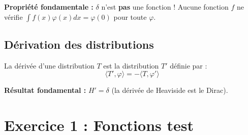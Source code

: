 \documentclass[11pt,a4paper]{report}
\begin{document}
\textbf{Propriété fondamentale :} $\delta$ n'est \textbf{pas} une fonction ! Aucune fonction $f$ ne vérifie $\int f(x)\varphi(x)dx = \varphi(0)$ pour toute $\varphi$.

\subsection*{Dérivation des distributions}

\begin{tcolorbox}[colback=ThemeLight, colframe=Theme, title=Définition : Dérivée d'une distribution]
La dérivée d'une distribution $T$ est la distribution $T'$ définie par :
\[
\langle T', \varphi \rangle = -\langle T, \varphi' \rangle
\]
\end{tcolorbox}

\textbf{Résultat fondamental :} $H' = \delta$ (la dérivée de Heaviside est le Dirac).

\vspace{1em}

\section*{Exercice 1 : Fonctions test}
\end{document}
